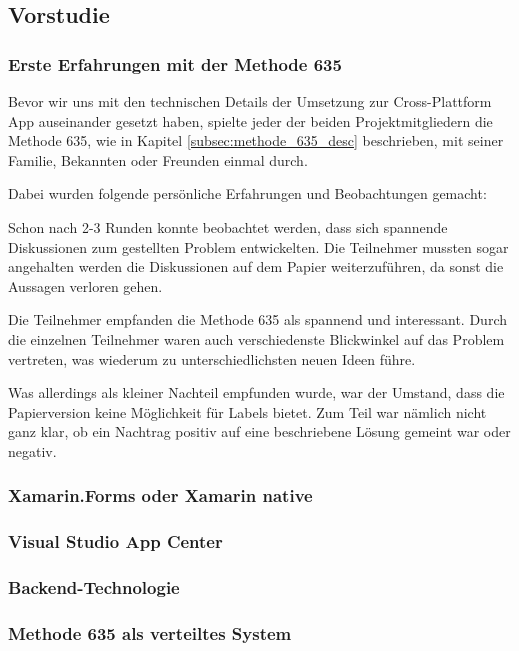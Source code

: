 \subsection{Vorstudie}

\subsubsection{Erste Erfahrungen mit der Methode 635}
Bevor wir uns mit den technischen Details der Umsetzung zur Cross-Plattform App auseinander gesetzt haben, spielte jeder der beiden Projektmitgliedern die Methode 635, wie in Kapitel \ref{subsec:methode_635_desc} beschrieben, mit seiner Familie, Bekannten oder Freunden einmal durch. 

Dabei wurden folgende persönliche Erfahrungen und Beobachtungen gemacht:

\begin{description}[leftmargin=!,labelwidth=\widthof{\bfseries Interessante Methode}]
	\item[Diskussion gestartet] Schon nach 2-3 Runden konnte beobachtet werden, dass sich spannende Diskussionen zum gestellten Problem entwickelten. Die Teilnehmer mussten sogar angehalten werden die Diskussionen auf dem Papier weiterzuführen, da sonst die Aussagen verloren gehen.
	\item[Interessante Methode] Die Teilnehmer empfanden die Methode 635 als spannend und interessant. Durch die einzelnen Teilnehmer waren auch verschiedenste Blickwinkel auf das Problem vertreten, was wiederum zu unterschiedlichsten neuen Ideen führe.
	\item[Labels einführen] Was allerdings als kleiner Nachteil empfunden wurde, war der Umstand, dass die Papierversion keine Möglichkeit für Labels bietet. Zum Teil war nämlich nicht ganz klar, ob ein Nachtrag positiv auf eine beschriebene Lösung gemeint war oder negativ.
\end{description}


\subsubsection{Xamarin.Forms oder Xamarin native}

\subsubsection{Visual Studio App Center}

\subsubsection{Backend-Technologie}

\subsubsection{Methode 635 als verteiltes System}
